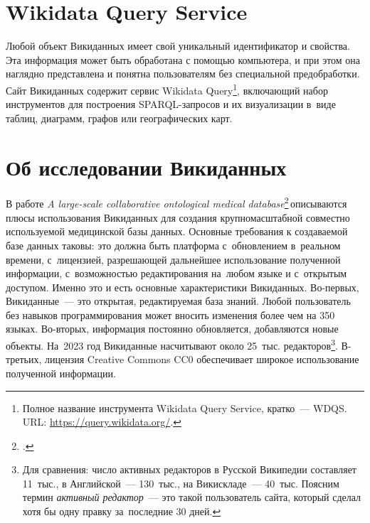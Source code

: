 \section{Wikidata Query Service}
\label{sect:WDQS}

Любой объект Викиданных имеет свой уникальный идентификатор и свойства. 
Эта информация может быть обработана с помощью компьютера, 
и при этом она наглядно представлена и понятна пользователям без специальной предобработки. 
Сайт Викиданных содержит сервис Wikidata Query\footnote{%
%
Полное название инструмента Wikidata Query Service, кратко~--- WDQS. URL: 
\href{https://query.wikidata.org/}{https://query.wikidata.org/}.%
%
}, включающий набор инструментов для построения SPARQL-запросов 
и их визуализации в~виде таблиц, диаграмм, графов или географических карт.




\section{Об исследовании Викиданных}

В работе \textit{A large-scale collaborative ontological medical database}\footnote{%
.}\,описываются плюсы использования Викиданных для создания крупномасштабной 
совместно используемой медицинской базы данных. 
Основные требования к создаваемой базе данных таковы: 
это должна быть платформа с~обновлением в~реальном времени, 
с~лицензией, разрешающей дальнейшее использование полученной информации, 
с~возможностью редактирования на~любом языке и с~открытым доступом. 
Именно это и есть основные характеристики Викиданных. 
Во-первых, Викиданные~--- это открытая, редактируемая база знаний. 
Любой пользователь без навыков программирования может вносить изменения 
более чем на 350 языках. 
Во-вторых, информация постоянно обновляется, добавляются новые объекты. 
На~2023 год Викиданные насчитывают около 25~тыс. редакторов\footnote{Для сравнения: 
число активных редакторов в Русской Википедии 
составляет 11~тыс., в Английской~--- 130~тыс., на Викискладе~--- 40~тыс. 
Поясним термин \emph{активный редактор}~--- это такой пользователь сайта, 
который сделал хотя бы одну правку за~последние 30 дней.}. 
В-третьих, лицензия Creative Commons CC0 обеспечивает широкое использование полученной информации. 

